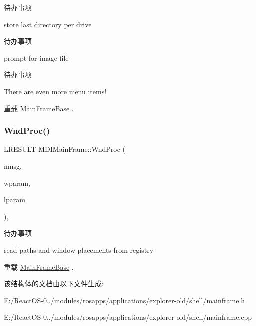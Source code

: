 \begin{DoxyRefDesc}{待办事项}
\item[\hyperlink{todo__todo000036}{待办事项}]store last directory per drive \end{DoxyRefDesc}


\begin{DoxyRefDesc}{待办事项}
\item[\hyperlink{todo__todo000037}{待办事项}]prompt for image file \end{DoxyRefDesc}


\begin{DoxyRefDesc}{待办事项}
\item[\hyperlink{todo__todo000038}{待办事项}]There are even more menu items! \end{DoxyRefDesc}


重载 \hyperlink{struct_main_frame_base}{Main\+Frame\+Base} .

\mbox{\label{struct_m_d_i_main_frame_a813007858144546db05a679773c7cda7}} 
\subsubsection{\texorpdfstring{Wnd\+Proc()}{WndProc()}}
{\footnotesize\ttfamily L\+R\+E\+S\+U\+LT M\+D\+I\+Main\+Frame\+::\+Wnd\+Proc (\begin{DoxyParamCaption}\item[{U\+I\+NT}]{nmsg,  }\item[{W\+P\+A\+R\+AM}]{wparam,  }\item[{L\+P\+A\+R\+AM}]{lparam }\end{DoxyParamCaption})\hspace{0.3cm}{\ttfamily [protected]}, {\ttfamily [virtual]}}

\begin{DoxyRefDesc}{待办事项}
\item[\hyperlink{todo__todo000035}{待办事项}]read paths and window placements from registry \end{DoxyRefDesc}


重载 \hyperlink{struct_main_frame_base}{Main\+Frame\+Base} .



该结构体的文档由以下文件生成\+:\begin{DoxyCompactItemize}
\item 
E\+:/\+React\+O\+S-\/0../modules/rosapps/applications/explorer-\/old/shell/mainframe.\+h\item 
E\+:/\+React\+O\+S-\/0../modules/rosapps/applications/explorer-\/old/shell/mainframe.\+cpp\end{DoxyCompactItemize}
